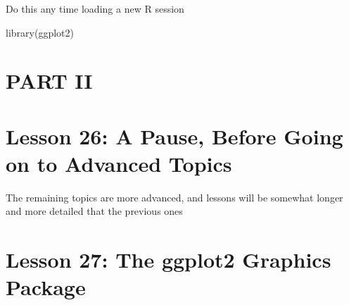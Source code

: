 \documentclass[
]{article}
\newenvironment{Shaded}{\begin{snugshade}}{\end{snugshade}}
\newcommand{\FunctionTok}[1]{\textcolor[rgb]{0.00,0.00,0.00}{#1}}
\newcommand{\NormalTok}[1]{#1}
\begin{document}
Do this any time loading a new R session

\begin{Shaded}
\begin{Highlighting}[]
\FunctionTok{library}\NormalTok{(ggplot2)}
\end{Highlighting}
\end{Shaded}

\hypertarget{part-ii}{%
\section{PART II}\label{part-ii}}

\hypertarget{lesson-26-a-pause-before-going-on-to-advanced-topics}{%
\section{Lesson 26: A Pause, Before Going on to Advanced
Topics}\label{lesson-26-a-pause-before-going-on-to-advanced-topics}}

The remaining topics are more advanced, and lessons will be somewhat
longer and more detailed that the previous ones

\hypertarget{lesson-27-the-ggplot2-graphics-package}{%
\section{Lesson 27: The ggplot2 Graphics
Package}\label{lesson-27-the-ggplot2-graphics-package}}
\end{document}
